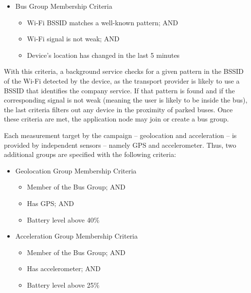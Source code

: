 \begin{itemize}
	
	\item Bus Group Membership Criteria
	
	\begin{itemize}
		
		\item Wi-Fi BSSID matches a well-known pattern; AND
		
		\item Wi-Fi signal is not weak; AND
		
		\item Device's location has changed in the last 5 minutes
		
	\end{itemize}
	
\end{itemize}

With this criteria, a background service checks for a given pattern in the BSSID of the Wi-Fi detected by the device, as the transport provider is likely to use a BSSID that identifies the company service. If that pattern is found and if the corresponding signal is not weak (meaning the user is likely to be inside the bus), the last criteria filters out any device in the proximity of parked buses. Once these criteria are met, the application node may join or create a bus group.

Each measurement target by the campaign -- geolocation and acceleration -- is provided by independent sensors -- namely GPS and accelerometer. Thus, two additional groups are specified with the following criteria:

\begin{itemize}
	
	\item Geolocation Group Membership Criteria
	
	\begin{itemize}
		
		\item Member of the Bus Group; AND
		
		\item Has GPS; AND
		
		\item Battery level above 40\%
		
	\end{itemize}
	
	\item Acceleration Group Membership Criteria
	
	\begin{itemize}
		
		\item Member of the Bus Group; AND
		
		\item Has accelerometer; AND
		
		\item Battery level above 25\%
		
	\end{itemize}
	
\end{itemize}

